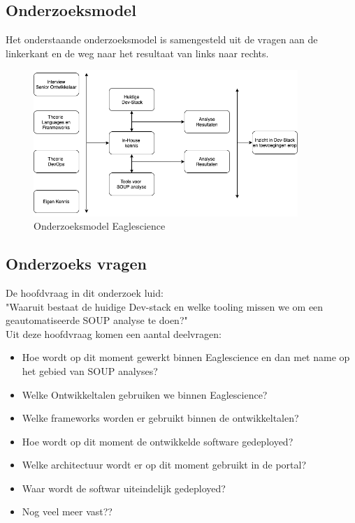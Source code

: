 \subsection{Onderzoeksmodel}
Het onderstaande onderzoeksmodel is samengesteld uit de vragen aan de linkerkant en de weg naar het resultaat van links naar rechts.\\
\begin{figure}[h!]
\myfloatalign
\includegraphics[width=10cm]{gfx/OnderzoeksmodelES}
\caption{Onderzoeksmodel Eaglescience}
\label{fig:Onderzoeks model Dev-Stack}
\end{figure}

\subsection{Onderzoeks vragen}
De hoofdvraag in dit onderzoek luid: \\
"Waaruit bestaat de huidige Dev-stack en welke tooling missen we om een geautomatiseerde SOUP analyse te doen?"\\
Uit deze hoofdvraag komen een aantal deelvragen:

\begin{itemize}
  \item Hoe wordt op dit moment gewerkt binnen Eaglescience en dan met name op het gebied van SOUP analyses?
  \item Welke Ontwikkeltalen gebruiken we binnen Eaglescience?
  \item Welke frameworks worden er gebruikt binnen de ontwikkeltalen?
  \item Hoe wordt op dit moment de ontwikkelde software gedeployed?
  \item Welke architectuur wordt er op dit moment gebruikt in de portal?
  \item Waar wordt de softwar uiteindelijk gedeployed?
  \item Nog veel meer vast??
\end{itemize}

